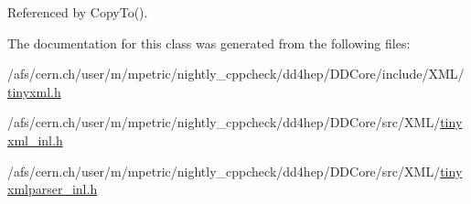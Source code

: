 Referenced by Copy\+To().



The documentation for this class was generated from the following files\+:\begin{DoxyCompactItemize}
\item 
/afs/cern.\+ch/user/m/mpetric/nightly\+\_\+cppcheck/dd4hep/\+D\+D\+Core/include/\+X\+M\+L/\hyperlink{tinyxml_8h}{tinyxml.\+h}\item 
/afs/cern.\+ch/user/m/mpetric/nightly\+\_\+cppcheck/dd4hep/\+D\+D\+Core/src/\+X\+M\+L/\hyperlink{tinyxml__inl_8h}{tinyxml\+\_\+inl.\+h}\item 
/afs/cern.\+ch/user/m/mpetric/nightly\+\_\+cppcheck/dd4hep/\+D\+D\+Core/src/\+X\+M\+L/\hyperlink{tinyxmlparser__inl_8h}{tinyxmlparser\+\_\+inl.\+h}\end{DoxyCompactItemize}
